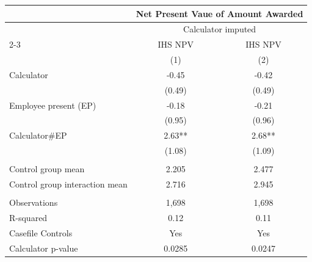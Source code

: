 \begin{tabular}{lcc}
\toprule
      & \multicolumn{2}{c}{Net Present Vaue of Amount Awarded} \\
\midrule
\midrule
      & \multicolumn{2}{c}{Calculator imputed} \\
\cmidrule{2-3}      & IHS NPV & IHS NPV \\
\midrule
\midrule
      & (1)   & (2) \\
\midrule
\midrule
Calculator & -0.45 & -0.42 \\
      & (0.49) & (0.49) \\
Employee present (EP) & -0.18 & -0.21 \\
      & (0.95) & (0.96) \\
Calculator\#EP & 2.63** & 2.68** \\
      & (1.08) & (1.09) \\
      &       &  \\
\midrule
Control group mean & 2.205 & 2.477 \\
Control group interaction mean & 2.716 & 2.945 \\
\midrule
      &       &  \\
\midrule
Observations & 1,698 & 1,698 \\
R-squared & 0.12  & 0.11 \\
Casefile Controls & Yes   & Yes \\
Calculator p-value & 0.0285 & 0.0247 \\
\bottomrule
\bottomrule
\end{tabular}%
